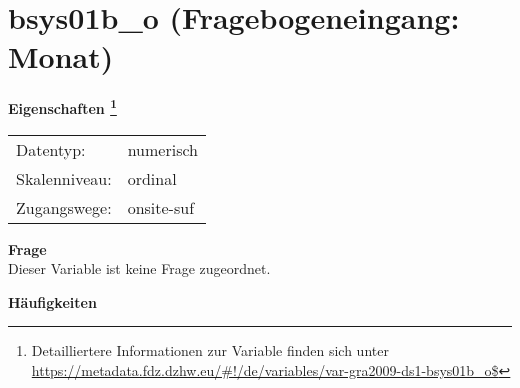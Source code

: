 
    \setcounter{footnote}{0}

    \vspace*{-1.8cm}
	\section{bsys01b\_o (Fragebogeneingang: Monat)}
	\label{section:bsys01b_o}



    \vspace*{0.5cm}
    \noindent\textbf{Eigenschaften
	\footnote{Detailliertere Informationen zur Variable finden sich unter
		\url{https://metadata.fdz.dzhw.eu/\#!/de/variables/var-gra2009-ds1-bsys01b_o$}}}\\
	\begin{tabularx}{\hsize}{@{}lX}
	Datentyp: & numerisch \\
	Skalenniveau: & ordinal \\
	Zugangswege: &
	  onsite-suf
 \\
    \end{tabularx}



		\vspace*{0.5cm}
		\noindent\textbf{Frage}\\
		Dieser Variable ist keine Frage zugeordnet.





        		\vspace*{0.5cm}
                \noindent\textbf{Häufigkeiten}

